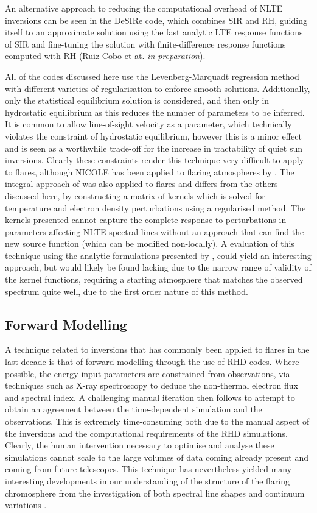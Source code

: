 An alternative approach to reducing the computational overhead of NLTE inversions can be seen in the DeSIRe code, which combines SIR and RH, guiding itself to an approximate solution using the fast analytic LTE response functions of SIR and fine-tuning the solution with finite-difference response functions computed with RH (Ruiz Cobo et at. \emph{in preparation}).

All of the codes discussed here use the Levenberg-Marquadt regression method with different varieties of regularisation to enforce smooth solutions.
Additionally, only the statistical equilibrium solution is considered, and then only in hydrostatic equilibrium as this reduces the number of parameters to be inferred.
It is common to allow line-of-sight velocity as a parameter, which technically violates the constraint of hydrostatic equilibrium, however this is a minor effect and is seen as a worthwhile trade-off for the increase in tractability of quiet sun inversions.
Clearly these constraints render this technique very difficult to apply to flares, although NICOLE has been applied to flaring atmospheres by \citet{Kuridze2018}.
The integral approach of \citep{Metcalf1990a} was also applied to flares and differs from the others discussed here, by constructing a matrix of kernels which is solved for temperature and electron density perturbations using a regularised method.
The kernels presented cannot capture the complete response to perturbations in parameters affecting NLTE spectral lines without an approach that can find the new source function (which can be modified non-locally).
A evaluation of this technique using the analytic formulations presented by \citet{Milic2017}, could yield an interesting approach, but would likely be found lacking due to the narrow range of validity of the kernel functions, requiring a starting atmosphere that matches the observed spectrum quite well, due to the first order nature of this method.


\subsection{Forward Modelling}

A technique related to inversions that has commonly been applied to flares in the last decade is that of forward modelling through the use of RHD codes.
Where possible, the energy input parameters are constrained from observations, via techniques such as X-ray spectroscopy to deduce the non-thermal electron flux and spectral index.
A challenging manual iteration then follows to attempt to obtain an agreement between the time-dependent simulation and the observations.
This is extremely time-consuming both due to the manual aspect of the inversions and the computational requirements of the RHD simulations.
Clearly, the human intervention necessary to optimise and analyse these simulations cannot scale to the large volumes of data coming already present and coming from future telescopes.
This technique has nevertheless yielded many interesting developments in our understanding of the structure of the flaring chromosphere from the investigation of both spectral line shapes and continuum variations \citep{Kuridze2015,RubioDaCosta2016, Kowalski2017,Simoes2017}.

